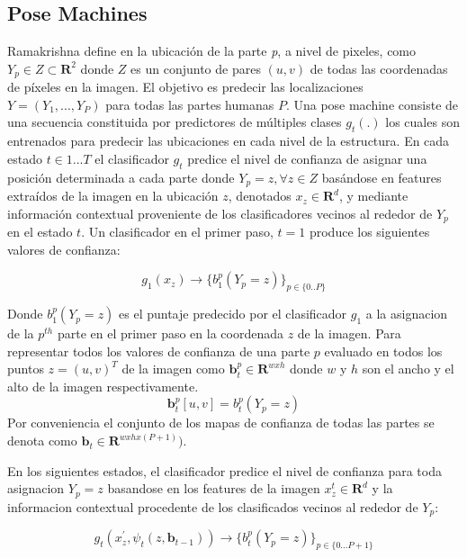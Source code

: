 \documentclass[runningheads]{llncs}
\begin{document}
\subsection{Pose Machines}

Ramakrishna define en \cite{posemachine} la ubicación de la parte \textit{p}, a nivel de pixeles, como $Y_{\textit{p}} \in Z \subset \mathbf{R}^{2}$ donde $Z$ es un conjunto de pares $(u,v)$ de todas las coordenadas de píxeles en la imagen. El objetivo es predecir las localizaciones $ Y = (Y_{1},..., Y_{\textit{P}}) $ para todas las partes humanas $P$. Una pose machine consiste de una secuencia constituida por predictores de múltiples clases $g_{t}(.)$ los cuales son entrenados para predecir las ubicaciones en cada nivel de la estructura. En cada estado $t \in {1...T}$ el clasificador $g_{t}$ predice el nivel de confianza de asignar una posición determinada a cada parte  donde $Y_{\textit{p}} = z, \forall z \in Z$ basándose en features extraídos de la imagen en la ubicación $z$, denotados $ x_{z} \in \mathbf{R}^{d}$, y mediante información contextual proveniente de los clasificadores vecinos al rededor de $Y_{\textit{p}}$ en el estado $t$.
Un clasificador en el primer paso, $t= 1$ produce los siguientes valores de confianza:

\begin{equation}
g_{1}(x_{z}) \rightarrow \{ b_{1}^p(Y_{p} = z) \}_{p \in \{0..P\}}
\end{equation}

Donde $ b_{1}^p(Y_{p} = z)$ es el puntaje predecido por el clasificador $g_1$ a la asignacion de la $p^{th}$ parte en el primer paso en la coordenada $z$ de la imagen. Para representar todos los valores de confianza de una parte $p$ evaluado en todos los puntos $z=(u,v)^T$ de la imagen como $\textbf{b}_t^p \in \mathbf{R}^{wxh}$ donde $w$ y $h$ son el ancho y el alto de la imagen respectivamente.
\begin{equation}
\textbf{b}_t^p[u,v]= b_t^p(Y_p = z)
\end{equation}
Por conveniencia el conjunto de los mapas de confianza de todas las partes se denota como $\textbf{b}_t \in \mathbf{R}^{wxhx(P+1)})$.

En los siguientes estados, el clasificador predice el nivel de confianza para toda asignacion $Y_p = z$ basandose en los features de la imagen $x_z^t \in \mathbf{R}^d$ y la informacion contextual procedente de los clasificados vecinos al rededor de $Y_p$:

\begin{equation}
g_t(x_z^{'}, \psi_t(z,\textbf{b}_{t-1})) \rightarrow \{ b_t^p(Y_p = z)  \}_{p \in \{0...P+1 \}}
\end{equation}
\end{document}
